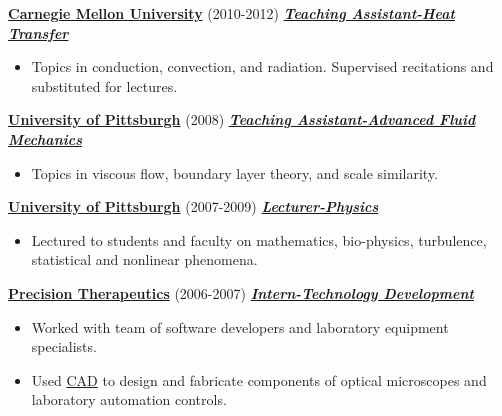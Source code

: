 \documentclass{article}
\newcommand{\employer}[3]{{ \textbf{#1} (#2) \underline{\textbf{\emph{#3}}}\\  }}
\newenvironment{achievements}{\begin{list}{$\bullet$}{\topsep 0pt \itemsep -2pt}}{\vspace*{4pt}\end{list}}
\begin{document}
\begin{itemize}

\end{itemize}


\employer{\href{https://www.cmu.edu/me/}{Carnegie Mellon University}}{2010-2012}{Teaching Assistant-Heat Transfer}
  \begin{itemize}[leftmargin=*]
    \item Topics in conduction, convection, and radiation. Supervised recitations and substituted for lectures. 
  \end{itemize}

\employer{\href{http://www.engineering.pitt.edu/MEMS/}{University of Pittsburgh}}{2008}{Teaching Assistant-Advanced Fluid Mechanics}
  \begin{itemize}[leftmargin=*]
    \item Topics in viscous flow, boundary layer theory, and scale similarity. 
  \end{itemize}

\employer{\href{http://www.physicsandastronomy.pitt.edu/}{University of Pittsburgh}}{2007-2009}{Lecturer-Physics}
  \begin{itemize}[leftmargin=*]
    \item Lectured to students and faculty on mathematics, bio-physics, turbulence, statistical and nonlinear phenomena. 
  \end{itemize}

\employer{\href{http://www.precisiontherapeutics.com/}{Precision Therapeutics}}{2006-2007}{Intern-Technology Development}
  \begin{itemize}[leftmargin=*]
    \item Worked with team of software developers and laboratory equipment specialists.
    \item Used \href{http://en.wikipedia.org/wiki/Computer-aided_design}{CAD} to design and fabricate components of optical microscopes and laboratory automation controls. 
  \end{itemize}
\end{document}
